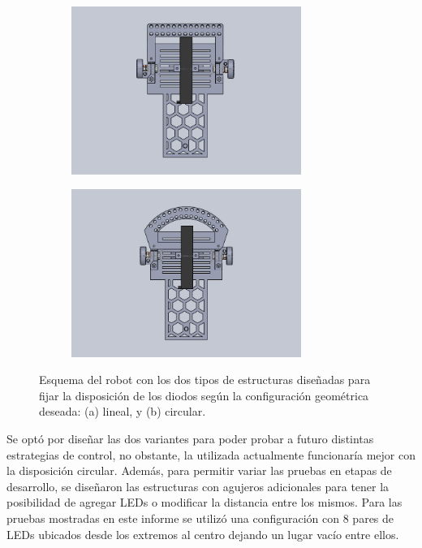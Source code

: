 \documentclass[10pt,conference,a4paper,onecolumn]{article}%
\begin{document}
\begin{figure}[h!]%
    \centering
    \begin{subfigure}[h]{0.45\textwidth}
    	\centering
        \includegraphics[width=7.5cm]{./imagenes/conSensorLineal.png}
        \caption{}
    \end{subfigure}
    \quad
    \begin{subfigure}[h]{0.45\textwidth}
    	\centering
        \includegraphics[width=7.5cm]{./imagenes/conSensorCircular.png}
        \caption{}
    \end{subfigure}
    \caption{Esquema del robot con los dos tipos de estructuras diseñadas para fijar la disposición de los diodos según la configuración geométrica deseada: (a) lineal, y (b) circular.}
	\label{fig:estructuraSensor}
\end{figure}

Se optó por diseñar las dos variantes para poder probar a futuro distintas estrategias de control, no obstante, la utilizada actualmente funcionaría mejor con la disposición circular. Además, para permitir variar las pruebas en etapas de desarrollo, se diseñaron las estructuras con agujeros adicionales para tener la posibilidad de agregar LEDs o modificar la distancia entre los mismos. Para las pruebas mostradas en este informe se utilizó una configuración con 8 pares de LEDs ubicados desde los extremos al centro dejando un lugar vacío entre ellos.
\end{document}
